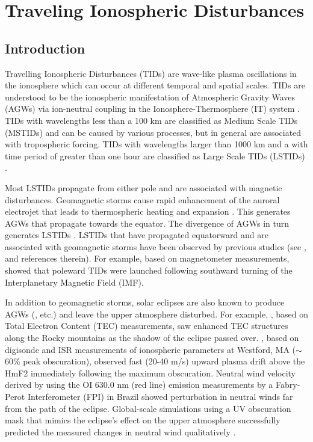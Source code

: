 \chapter{Traveling Ionospheric Disturbances}

\section{Introduction}
Travelling Ionospheric Disturbances (TIDs) are wave-like plasma oscillations in the ionosphere which can occur at different temporal and spatial scales. TIDs are understood to be the ionospheric manifestation of Atmospheric Gravity Waves (AGWs) via ion-neutral coupling in the Ionosphere-Thermosphere (IT) system \citep{hines_1960}. TIDs with wavelengths less than a 100 km are classified as Medium Scale TIDs (MSTIDs) and can be caused by various processes, but in general are associated with tropospheric forcing. TIDs with wavelengths larger than 1000 km and a with time period of greater than one hour are classified as Large Scale TIDs (LSTIDs) \citep{hocke1996review}.

Most LSTIDs propagate from either pole and are associated with magnetic disturbances. Geomagnetic storms cause rapid enhancement of the auroral electrojet that leads to thermospheric heating and expansion \citep{davis_polar_1971,chimonas_atmospheric_1970}. This generates AGWs that propagate towards the equator. The divergence of AGWs in turn generates LSTIDs \citep{prolss_lstid_2000}. LSTIDs that have propagated equatorward and are associated with geomagnetic storms have been observed by previous studies (see \citet{habarulema_storm_tid}, and references therein). For example, based on magnetometer measurements, \citet{habarulema_storm_tid} showed that poleward TIDs were launched following southward turning of the Interplanetary Magnetic Field (IMF).

In addition to geomagnetic storms, solar eclipses are also known to produce AGWs (\citet{liu_1998, chimonas1970}, etc.) and leave the upper atmosphere disturbed. For example, \citet{coster_gnss_2017}, based on Total Electron Content (TEC) measurements, saw enhanced TEC structures along the Rocky mountains as the shadow of the eclipse passed over. \citet{goncharenko_mh_hill_eclipse}, based on digisonde and ISR measurements of ionospheric parameters at Westford, MA ($\sim$ 60\% peak obscuration), observed fast (20-40 m/s) upward plasma drift above the HmF2 immediately following the maximum obscuration. Neutral wind velocity derived by using the OI 630.0 nm (red line) emission measurements by a Fabry-Perot Interferometer (FPI) in Brazil showed perturbation in neutral winds far from the path of the eclipse. Global-scale simulations using a UV obscuration mask that mimics the eclipse's effect on the upper atmosphere successfully predicted the measured changes in neutral wind qualitatively \citep{harding_nightside_eclipse}.

